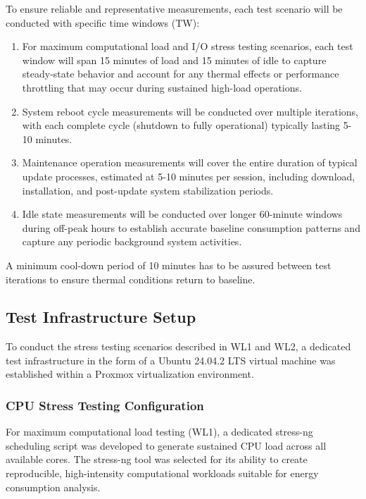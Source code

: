 To ensure reliable and representative measurements, each test scenario will be
conducted with specific time windows (TW):

\begin{enumerate}[label=TW\arabic*]
    \item For maximum computational load and I/O stress testing scenarios, each
    test window will span 15 minutes of load and 15 minutes of idle to capture steady-state 
    behavior and account for any thermal effects or performance throttling that may occur during
    sustained high-load operations.

    \item System reboot cycle measurements will be conducted over multiple
    iterations, with each complete cycle (shutdown to fully operational)
    typically lasting 5-10 minutes.

    \item Maintenance operation measurements will cover the entire duration of
    typical update processes, estimated at 5-10 minutes per session, including
    download, installation, and post-update system stabilization periods.

    \item Idle state measurements will be conducted over longer 60-minute windows
    during off-peak hours to establish accurate baseline consumption patterns and
    capture any periodic background system activities.
\end{enumerate}

A minimum cool-down period of 10 minutes has to be assured between test iterations to 
ensure thermal conditions return to baseline.

\subsection{Test Infrastructure Setup}
\label{methodology:test-infrastructure-setup}

To conduct the stress testing scenarios described in WL1 and WL2, a dedicated test infrastructure 
in the form of a Ubuntu 24.04.2 LTS virtual machine was established within a Proxmox virtualization
environment.

\subsubsection{CPU Stress Testing Configuration}
\label{methodology:cpu-stress-testing-configuration}

For maximum computational load testing (WL1), a dedicated stress-ng scheduling 
script was developed to generate sustained CPU load across all available cores. 
The stress-ng tool was selected for its ability to create reproducible, 
high-intensity computational workloads suitable for energy consumption analysis.

